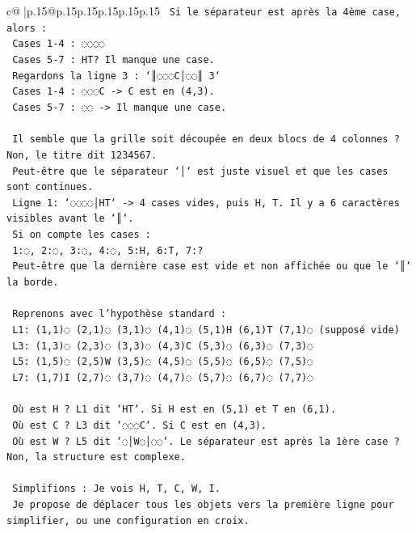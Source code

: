 \documentclass{article}
\begin{document}
{\begin{supertabular}{c@{$\;$}|p{.15\linewidth}@{}p{.15\linewidth}p{.15\linewidth}p{.15\linewidth}p{.15\linewidth}p{.15\linewidth}}
{{{\texttt{  Si le séparateur est après la 4ème case, alors :} \\
\texttt{  Cases 1{-}4 : ◌◌◌◌} \\
\texttt{  Cases 5{-}7 : HT? Il manque une case.} \\
\texttt{  Regardons la ligne 3 : `║◌◌◌C│◌◌║ 3`} \\
\texttt{  Cases 1{-}4 : ◌◌◌C {-}> C est en (4,3).} \\
\texttt{  Cases 5{-}7 : ◌◌ {-}> Il manque une case.} \\
\\ 
\texttt{  Il semble que la grille soit découpée en deux blocs de 4 colonnes ? Non, le titre dit 1234567.} \\
\texttt{  Peut{-}être que le séparateur `│` est juste visuel et que les cases sont continues.} \\
\texttt{  Ligne 1: `◌◌◌◌│HT` {-}> 4 cases vides, puis H, T. Il y a 6 caractères visibles avant le `║`.} \\
\texttt{  Si on compte les cases :} \\
\texttt{  1:◌, 2:◌, 3:◌, 4:◌, 5:H, 6:T, 7:?} \\
\texttt{  Peut{-}être que la dernière case est vide et non affichée ou que le `║` la borde.} \\
\\ 
\texttt{  Reprenons avec l'hypothèse standard :} \\
\texttt{  L1: (1,1)◌ (2,1)◌ (3,1)◌ (4,1)◌ (5,1)H (6,1)T (7,1)◌ (supposé vide)} \\
\texttt{  L3: (1,3)◌ (2,3)◌ (3,3)◌ (4,3)C (5,3)◌ (6,3)◌ (7,3)◌} \\
\texttt{  L5: (1,5)◌ (2,5)W (3,5)◌ (4,5)◌ (5,5)◌ (6,5)◌ (7,5)◌} \\
\texttt{  L7: (1,7)I (2,7)◌ (3,7)◌ (4,7)◌ (5,7)◌ (6,7)◌ (7,7)◌} \\
\\ 
\texttt{  Où est H ? L1 dit `HT`. Si H est en (5,1) et T en (6,1).} \\
\texttt{  Où est C ? L3 dit `◌◌◌C`. Si C est en (4,3).} \\
\texttt{  Où est W ? L5 dit `◌│W◌│◌◌`. Le séparateur est après la 1ère case ? Non, la structure est complexe.} \\
\\ 
\texttt{  Simplifions : Je vois H, T, C, W, I.} \\
\texttt{  Je propose de déplacer tous les objets vers la première ligne pour simplifier, ou une configuration en croix.} \\
}}}
\end{supertabular}}
\end{document}
